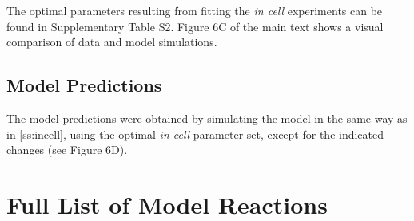\documentclass[12pt]{article}
\begin{document}
	The optimal parameters resulting from fitting the \emph{in cell} experiments can be found in Supplementary Table S2. Figure 6C of the main text shows a visual comparison of data and model simulations.
	
	\subsection{Model Predictions}
	
	The model predictions were obtained by simulating the model in the
	same way as in \ref{ss:incell}, using the optimal \emph{in cell}
	parameter set, except for the indicated changes (see Figure 6D).
	
	\section{Full List of Model Reactions}
	\label{s:reactions}
\end{document}
